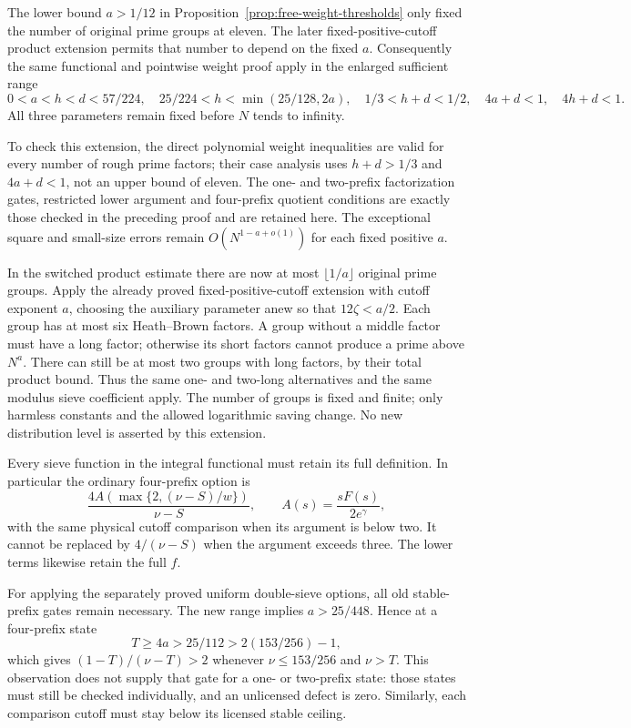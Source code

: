 \documentclass[11pt]{article}
\begin{document}
The lower bound $a>1/12$ in
Proposition~\ref{prop:free-weight-thresholds} only fixed the number
of original prime groups at eleven. The later fixed-positive-cutoff
product extension permits that number to depend on the fixed $a$.
Consequently the same functional and pointwise weight proof apply
in the enlarged sufficient range
\begin{equation}\label{eq:extended-free-threshold-range}
 0<a<h<d<57/224,\quad
 25/224<h<\min(25/128,2a),\quad
 1/3<h+d<1/2,\quad 4a+d<1,\quad4h+d<1.
\end{equation}
All three parameters remain fixed before $N$ tends to infinity.

To check this extension, the direct polynomial weight inequalities
are valid for every number of rough prime factors; their case
analysis uses $h+d>1/3$ and $4a+d<1$, not an upper bound of eleven.
The one- and two-prefix factorization gates, restricted lower
argument and four-prefix quotient conditions are exactly those
checked in the preceding proof and are retained here.
The exceptional square and small-size errors remain
$O(N^{1-a+o(1)})$ for each fixed positive $a$.

In the switched product estimate there are now at most
$\lfloor1/a\rfloor$ original prime groups. Apply the already
proved fixed-positive-cutoff extension with cutoff exponent $a$,
choosing the auxiliary parameter anew so that $12\zeta<a/2$.
Each group has at most six Heath--Brown factors. A group without
a middle factor must have a long factor; otherwise its short
factors cannot produce a prime above $N^a$. There can still be
at most two groups with long factors, by their total product bound.
Thus the same one- and two-long alternatives and the same modulus
sieve coefficient apply. The number of groups is fixed and finite;
only harmless constants and the allowed logarithmic saving change.
No new distribution level is asserted by this extension.

Every sieve function in the integral functional must retain its
full definition. In particular the ordinary four-prefix option is
\[
 \frac{4A(\max\{2,(\nu-S)/w\})}{\nu-S},
 \qquad A(s)=\frac{sF(s)}{2e^\gamma},
\]
with the same physical cutoff comparison when its argument is
below two. It cannot be replaced by $4/(\nu-S)$ when the argument
exceeds three. The lower terms likewise retain the full $f$.

For applying the separately proved uniform double-sieve options,
all old stable-prefix gates remain necessary. The new range implies
$a>25/448$. Hence at a four-prefix state
\[
 T\ge4a>25/112>2(153/256)-1,
\]
which gives $(1-T)/(\nu-T)>2$ whenever $\nu\le153/256$ and
$\nu>T$. This observation does not supply that gate for a one-
or two-prefix state: those states must still be checked individually,
and an unlicensed defect is zero. Similarly, each comparison cutoff
must stay below its licensed stable ceiling.
\end{document}
